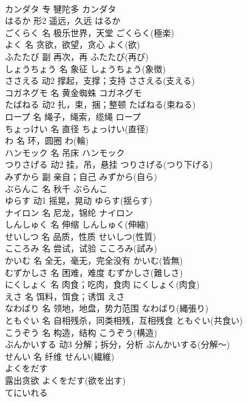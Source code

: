 \documentclass[8pt]{extreport}
\begin{document}
\begin{CJK}{UTF8}{min}
\\	カンダタ	专	犍陀多	カンダタ	
\\	はるか	形2	遥远，久远	はるか	
\\	ごくらく	名	极乐世界，天堂	ごくらく(極楽)	
\\	よく	名	贪欲，欲望，贪心	よく(欲)	
\\	ふたたび	副	再次，再	ふたたび(再び)	
\\	しょうちょう	名	象征	しょうちょう(象徴)	
\\	ささえる	动2	撑起，支撑；支持	ささえる(支える)	
\\	コガネグモ	名	黄金蜘蛛	コガネグモ	
\\	たばねる	动2	扎，束，捆；整顿	たばねる(束ねる)	
\\	ロープ	名	绳子，绳索，缆绳	ロープ	
\\	ちょっけい	名	直径	ちょっけい(直径)	
\\	わ	名	环，圆圈	わ(輪)	
\\	ハンモック	名	吊床	ハンモック	
\\	つりさげる	动2	挂，吊，悬挂	つりさげる(つり下げる)	
\\	みずから	副	亲自；自己	みずから(自ら)	
\\	ぶらんこ	名	秋千	ぶらんこ	
\\	ゆらす	动1	摇晃，晃动	ゆらす(揺らす)	
\\	ナイロン	名	尼龙，锦纶	ナイロン	
\\	しんしゅく	名	伸缩	しんしゅく(伸縮)	
\\	せいしつ	名	品质，性质	せいしつ(性質)	
\\	こころみ	名	尝试，试验	こころみ(試み)	
\\	かいむ	名	全无，毫无，完全没有	かいむ(皆無)	
\\	むずかしさ	名	困难，难度	むずかしさ(難しさ)	
\\	にくしょく	名	肉食；吃肉，食肉	にくしょく(肉食)	
\\	えさ	名	饵料，饵食；诱饵	えさ	
\\	なわばり	名	领地，地盘，势力范围	なわばり(縄張り)	
\\	ともぐい	名	自相残杀，同类相残，互相残食	ともぐい(共食い)	
\\	こうぞう	名	构造，结构	こうぞう(構造)	
\\	ぶんかいする	动3	分解；拆分，分析	ぶんかいする(分解～)	
\\	せんい	名	纤维	せんい(繊維)	
\\	よくをだす	
\\	露出贪欲	よくをだす(欲を出す)	
\\	てにいれる	

\end{CJK}
\end{document}

